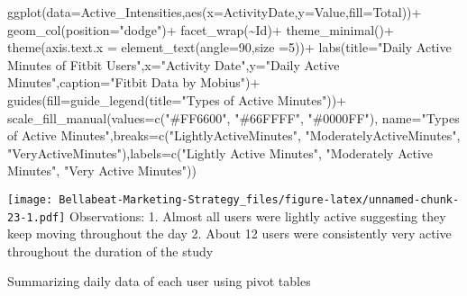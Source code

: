 \documentclass[
]{article}
\newenvironment{Shaded}{\begin{snugshade}}{\end{snugshade}}
\newcommand{\AttributeTok}[1]{\textcolor[rgb]{0.77,0.63,0.00}{#1}}
\newcommand{\DecValTok}[1]{\textcolor[rgb]{0.00,0.00,0.81}{#1}}
\newcommand{\FunctionTok}[1]{\textcolor[rgb]{0.00,0.00,0.00}{#1}}
\newcommand{\NormalTok}[1]{#1}
\newcommand{\SpecialCharTok}[1]{\textcolor[rgb]{0.00,0.00,0.00}{#1}}
\newcommand{\StringTok}[1]{\textcolor[rgb]{0.31,0.60,0.02}{#1}}
\begin{document}
\begin{Shaded}
\begin{Highlighting}[]
\FunctionTok{ggplot}\NormalTok{(}\AttributeTok{data=}\NormalTok{Active\_Intensities,}\FunctionTok{aes}\NormalTok{(}\AttributeTok{x=}\NormalTok{ActivityDate,}\AttributeTok{y=}\NormalTok{Value,}\AttributeTok{fill=}\NormalTok{Total))}\SpecialCharTok{+}
  \FunctionTok{geom\_col}\NormalTok{(}\AttributeTok{position=}\StringTok{"dodge"}\NormalTok{)}\SpecialCharTok{+}
  \FunctionTok{facet\_wrap}\NormalTok{(}\SpecialCharTok{\textasciitilde{}}\NormalTok{Id)}\SpecialCharTok{+}
  \FunctionTok{theme\_minimal}\NormalTok{()}\SpecialCharTok{+}
  \FunctionTok{theme}\NormalTok{(}\AttributeTok{axis.text.x =} \FunctionTok{element\_text}\NormalTok{(}\AttributeTok{angle=}\DecValTok{90}\NormalTok{,}\AttributeTok{size =}\DecValTok{5}\NormalTok{))}\SpecialCharTok{+}
  \FunctionTok{labs}\NormalTok{(}\AttributeTok{title=}\StringTok{"Daily Active Minutes of Fitbit Users"}\NormalTok{,}\AttributeTok{x=}\StringTok{"Activity Date"}\NormalTok{,}\AttributeTok{y=}\StringTok{"Daily Active Minutes"}\NormalTok{,}\AttributeTok{caption=}\StringTok{"Fitbit Data by Mobius"}\NormalTok{)}\SpecialCharTok{+}
  \FunctionTok{guides}\NormalTok{(}\AttributeTok{fill=}\FunctionTok{guide\_legend}\NormalTok{(}\AttributeTok{title=}\StringTok{"Types of Active Minutes"}\NormalTok{))}\SpecialCharTok{+}
  \FunctionTok{scale\_fill\_manual}\NormalTok{(}\AttributeTok{values=}\FunctionTok{c}\NormalTok{(}\StringTok{"\#FF6600"}\NormalTok{, }\StringTok{"\#66FFFF"}\NormalTok{, }\StringTok{"\#0000FF"}\NormalTok{), }\AttributeTok{name=}\StringTok{"Types of Active Minutes"}\NormalTok{,}\AttributeTok{breaks=}\FunctionTok{c}\NormalTok{(}\StringTok{"LightlyActiveMinutes"}\NormalTok{, }\StringTok{"ModeratelyActiveMinutes"}\NormalTok{, }\StringTok{"VeryActiveMinutes"}\NormalTok{),}\AttributeTok{labels=}\FunctionTok{c}\NormalTok{(}\StringTok{"Lightly Active Minutes"}\NormalTok{, }\StringTok{"Moderately Active Minutes"}\NormalTok{, }\StringTok{"Very Active Minutes"}\NormalTok{))}
\end{Highlighting}
\end{Shaded}

\texttt{[image: Bellabeat-Marketing-Strategy\_files/figure-latex/unnamed-chunk-23-1.pdf]}
Observations: 1. Almost all users were lightly active suggesting they
keep moving throughout the day 2. About 12 users were consistently very
active throughout the duration of the study

Summarizing daily data of each user using pivot tables
\end{document}
